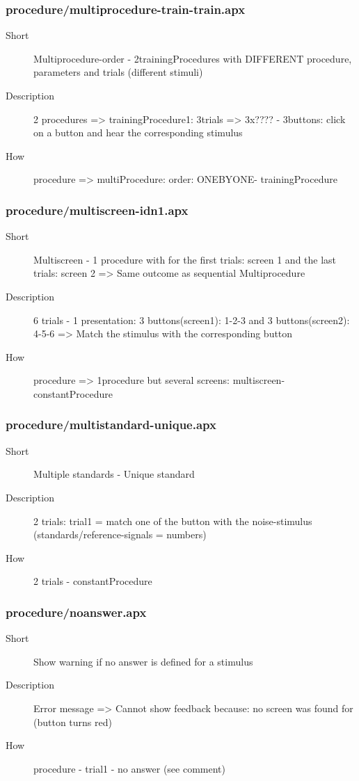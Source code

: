 \subsubsection{procedure/multiprocedure-train-train.apx}
\begin{description}
\item[Short] 
 Multiprocedure-order - 2trainingProcedures with DIFFERENT procedure, parameters and trials (different stimuli)
\item[Description] 
 2 procedures =\textgreater{} trainingProcedure1: 3trials =\textgreater{} 3x???? - 3buttons: click on a button and hear the corresponding stimulus
\item[How] 
 procedure =\textgreater{} multiProcedure: order: ONEBYONE- trainingProcedure
\end{description}

\subsubsection{procedure/multiscreen-idn1.apx}
\begin{description}
\item[Short] 
 Multiscreen - 1 procedure with for the first trials: screen 1 and the last trials: screen 2 =\textgreater{} Same outcome as sequential Multiprocedure
\item[Description] 
 6 trials - 1 presentation: 3 buttons(screen1): 1-2-3 and 3 buttons(screen2): 4-5-6 =\textgreater{} Match the stimulus with the corresponding button
\item[How] 
 procedure =\textgreater{} 1procedure but several screens: multiscreen- constantProcedure
\end{description}

\subsubsection{procedure/multistandard-unique.apx}
\begin{description}
\item[Short] 
 Multiple standards - Unique standard
\item[Description] 
 2 trials: trial1 = match one of the button with the noise-stimulus (standards/reference-signals = numbers)
\item[How] 
 2 trials - constantProcedure
\end{description}

\subsubsection{procedure/noanswer.apx}
\begin{description}
\item[Short] 
 Show warning if no answer is defined for a stimulus
\item[Description] 
 Error message =\textgreater{} Cannot show feedback because: no screen was found for (button turns red)
\item[How] 
 procedure - trial1 - no answer (see comment)
\end{description}

